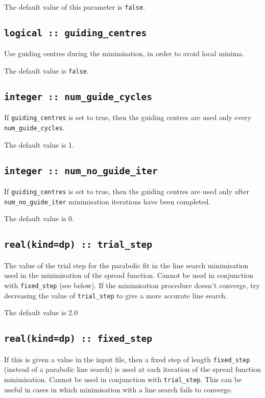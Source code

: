 The default value of this parameter is \verb#false#.


\subsection[guiding\_centres]{\tt logical :: guiding\_centres}
Use guiding centres during the minimisation, in order to avoid
local minima.

The default value is \verb#false#.

\subsection[num\_guide\_cycles]{\tt integer :: num\_guide\_cycles}
If \verb#guiding_centres# is set to true, then the
guiding centres are used only every \verb#num_guide_cycles#.

The default value is 1.

\subsection[num\_no\_guide\_iter]{\tt integer :: num\_no\_guide\_iter}
If \verb#guiding_centres# is set to true, then the
guiding centres are used only after \verb#num_no_guide_iter#
minimisation iterations have been completed.

The default value is 0.

\subsection[trial\_step]{\tt real(kind=dp) :: trial\_step}
The value of the trial step for the parabolic fit in the line
search minimisation used in the minimisation of the spread
function. Cannot be used in conjunction with \verb#fixed_step# (see
below). If the minimisation procedure doesn't converge, try decreasing
the value of \verb#trial_step# to give a more accurate line search.

The default value is 2.0

\subsection[fixed\_step]{\tt real(kind=dp) :: fixed\_step}
If this is given a value in the input file, then a fixed step of length
\verb#fixed_step# (instead of a parabolic
line search) is used at each iteration of the spread function
minimisation. Cannot be used in conjunction with
\verb#trial_step#. This can be useful in cases in which minimisation
with a line search fails to converge.

